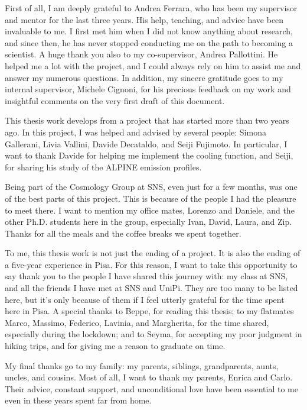 

First of all, I am deeply grateful to Andrea Ferrara, who has been my supervisor and mentor for the last three years. His help, teaching, and advice have been invaluable to me. I first met him when I did not know anything about research, and since then, he has never stopped conducting me on the path to becoming a scientist. A huge thank you also to my co-supervisor, Andrea Pallottini. He helped me a lot with the project, and I could always rely on him to assist me and answer my numerous questions. In addition, my sincere gratitude goes to my internal supervisor, Michele Cignoni, for his precious feedback on my work and insightful comments on the very first draft of this document. 

\vspace{0.5cm}
This thesis work develops from a project that has started more than two years ago. In this project, I was helped and advised by several people: Simona Gallerani, Livia Vallini, Davide Decataldo, and Seiji Fujimoto. In particular, I want to thank Davide for helping me implement the cooling function, and Seiji, for sharing his study of the ALPINE \CII emission profiles. 


\vspace{0.5cm}
Being part of the Cosmology Group at SNS, even just for a few months, was one of the best parts of this project. This is because of the people I had the pleasure to meet there. I want to mention my office mates, Lorenzo and Daniele, and the other Ph.D. students here in the group, especially Ivan, David, Laura, and Zip. Thanks for all the meals and the coffee breaks we spent together.


\vspace{0.5cm}
To me, this thesis work is not just the ending of a project. It is also the ending of a five-year experience in Pisa. For this reason, I want to take this opportunity to say thank you to the people I have shared this journey with: my class at SNS, and all the friends I have met at SNS and UniPi. They are too many to be listed here, but it's only because of them if I feel utterly grateful for the time spent here in Pisa. A special thanks to Beppe, for reading this thesis; to my flatmates Marco, Massimo, Federico, Lavinia, and Margherita, for the time shared, especially during the lockdown; and to Seyma, for accepting my poor judgment in hiking trips, and for giving me a reason to graduate on time.


\vspace{0.5cm}
My final thanks go to my family: my parents, siblings, grandparents, aunts, uncles, and cousins. Most of all, I want to thank my parents, Enrica and Carlo. Their advice, constant support, and unconditional love have been essential to me even in these years spent far from home. 
